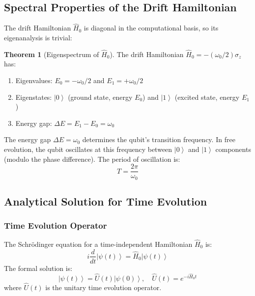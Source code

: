 \documentclass[11pt,a4paper]{article}
\theoremstyle{definition}
\newtheorem{theorem}{Theorem}[section]
\theoremstyle{remark}
\newcommand{\ket}[1]{\left|#1\right\rangle}
\begin{document}
\subsection{Spectral Properties of the Drift Hamiltonian}

The drift Hamiltonian $\hat{H}_0$ is diagonal in the computational basis, so its eigenanalysis is trivial:

\begin{theorem}[Eigenspectrum of $\hat{H}_0$]
The drift Hamiltonian $\hat{H}_0 = -(\omega_0/2) \sigma_z$ has:
\begin{enumerate}[label=(\roman*)]
    \item Eigenvalues: $E_0 = -\omega_0/2$ and $E_1 = +\omega_0/2$
    \item Eigenstates: $\ket{0}$ (ground state, energy $E_0$) and $\ket{1}$ (excited state, energy $E_1$)
    \item Energy gap: $\Delta E = E_1 - E_0 = \omega_0$
\end{enumerate}
\end{theorem}

The energy gap $\Delta E = \omega_0$ determines the qubit's transition frequency. In free evolution, the qubit oscillates at this frequency between $\ket{0}$ and $\ket{1}$ components (modulo the phase difference). The period of oscillation is:
\begin{equation}
T = \frac{2\pi}{\omega_0}
\label{eq:period}
\end{equation}

\subsection{Analytical Solution for Time Evolution}

\subsubsection{Time Evolution Operator}

The Schrödinger equation for a time-independent Hamiltonian $\hat{H}_0$ is:
\begin{equation}
i \frac{d}{dt} \ket{\psi(t)} = \hat{H}_0 \ket{\psi(t)}
\end{equation}
The formal solution is:
\begin{equation}
\ket{\psi(t)} = \hat{U}(t) \ket{\psi(0)}, \quad \hat{U}(t) = e^{-i \hat{H}_0 t}
\end{equation}
where $\hat{U}(t)$ is the unitary time evolution operator.
\end{document}
